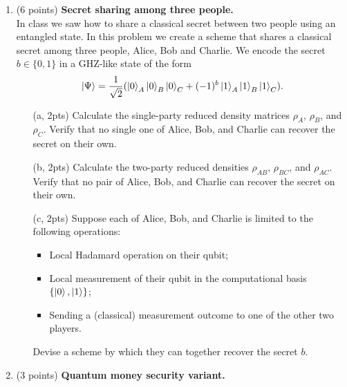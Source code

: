 \documentclass[12pt]{article}
\begin{document}
\begin{enumerate}
\item (6 points) \textbf{Secret sharing among three people.}\\
In class we saw how to share a classical secret between two people using an entangled state. In this problem we create a scheme that shares a classical secret among three people, Alice, Bob and Charlie. We encode the secret $b\in \{0,1\}$ in a GHZ-like state of the form
\[
\ket{\Psi} = \frac{1}{\sqrt{2}}(\ket{0}_A\ket{0}_B\ket{0}_C+ (-1)^b\ket{1}_A\ket{1}_B\ket{1}_C).
\]
\begin{enumerate}
\item[(a, 2pts)] Calculate the single-party reduced density matrices $\rho_A$, $\rho_B$, and $\rho_C$. Verify that no single one of Alice, Bob, and Charlie can recover the secret on their own.
\item[(b, 2pts)] Calculate the two-party reduced densities $\rho_{AB}$, $\rho_{BC}$, and $\rho_{AC}$. Verify that no pair of Alice, Bob, and Charlie can recover the secret on their own.
\item[(c, 2pts)] Suppose each of Alice, Bob, and Charlie is limited to the following operations:
	\begin{itemize}
	\item Local Hadamard operation on their qubit;
	\item Local measurement of their qubit in the computational basis $\{\ket{0},\ket{1}\}$;
	\item Sending a (classical) measurement outcome to one of the other two players.
	\end{itemize}
Devise a scheme by which they can together recover the secret $b$. 
\end{enumerate}

\item (3 points) {\bf Quantum money security variant.}


\end{enumerate}
\end{document}
